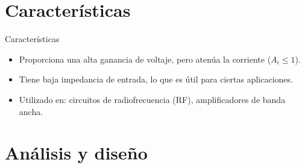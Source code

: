 \section{Características}
\begin{frame}{Características}
\begin{itemize}
    \item Proporciona una alta ganancia de voltaje, pero atenúa la corriente ($A_i \leq 1$).
    \item Tiene baja impedancia de entrada, lo que es útil para ciertas aplicaciones.
    \item Utilizado en: circuitos de radiofrecuencia (RF), amplificadores de banda ancha.
\end{itemize}
\end{frame}

\section{Análisis y diseño}
